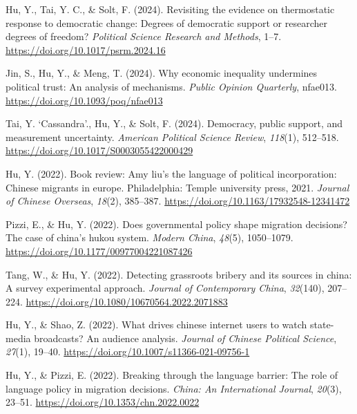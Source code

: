 \documentclass[
  12pt,
]
{article}
\newlength{\cslhangindent}
\newenvironment{CSLReferences}[2] %
 {\begin{list}{}{%
  \setlength{\itemindent}{0pt}
  \setlength{\leftmargin}{0pt}
  \setlength{\parsep}{0pt}
  \ifodd #1
   \setlength{\leftmargin}{\cslhangindent}
   \setlength{\itemindent}{-1\cslhangindent}
  \fi
  \setlength{\itemsep}{#2\baselineskip}}}
 {\end{list}}
\begin{document}
\label{refs-peer}
\begin{CSLReferences}{1}{0}
Hu, Y., Tai, Y. C., \& Solt, F. (2024). Revisiting the evidence on
thermostatic response to democratic change: Degrees of democratic
support or researcher degrees of freedom? \emph{Political Science
Research and Methods}, 1--7. \url{https://doi.org/10.1017/psrm.2024.16}

Jin, S., Hu, Y., \& Meng, T. (2024). Why economic inequality undermines
political trust: An analysis of mechanisms. \emph{Public Opinion
Quarterly}, nfae013. \url{https://doi.org/10.1093/poq/nfae013}

Tai, Y. `Cassandra'., Hu, Y., \& Solt, F. (2024). Democracy, public
support, and measurement uncertainty. \emph{American Political Science
Review}, \emph{118}(1), 512--518.
\url{https://doi.org/10.1017/S0003055422000429}

Hu, Y. (2022). Book review: Amy liu's the language of political
incorporation: Chinese migrants in europe. Philadelphia: Temple
university press, 2021. \emph{Journal of Chinese Overseas},
\emph{18}(2), 385--387. \url{https://doi.org/10.1163/17932548-12341472}

Pizzi, E., \& Hu, Y. (2022). Does governmental policy shape migration
decisions? The case of china's hukou system. \emph{Modern China},
\emph{48}(5), 1050--1079.
\url{https://doi.org/10.1177/00977004221087426}

Tang, W., \& Hu, Y. (2022). Detecting grassroots bribery and its sources
in china: A survey experimental approach. \emph{Journal of Contemporary
China}, \emph{32}(140), 207--224.
\url{https://doi.org/10.1080/10670564.2022.2071883}

Hu, Y., \& Shao, Z. (2022). What drives chinese internet users to watch
state-media broadcasts? An audience analysis. \emph{Journal of Chinese
Political Science}, \emph{27}(1), 19--40.
\url{https://doi.org/10.1007/s11366-021-09756-1}

Hu, Y., \& Pizzi, E. (2022). Breaking through the language barrier: The
role of language policy in migration decisions. \emph{China: An
International Journal}, \emph{20}(3), 23--51.
\url{https://doi.org/10.1353/chn.2022.0022}


\end{CSLReferences}
\end{document}
